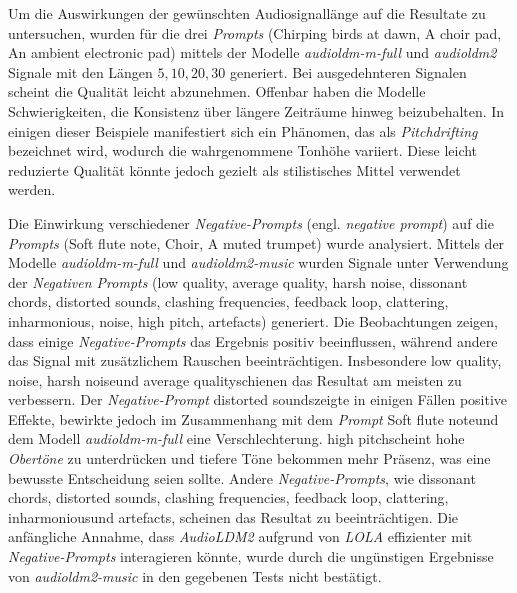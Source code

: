 \documentclass[
  a4paper,  %
  twoside,  %
  bibliography=totoc,
  headsepline,
  cleardoublepage=empty,
  parskip=half,
  draft=false
]{scrbook}
\begin{document}
{Um die Auswirkungen der gewünschten Audiosignallänge auf die Resultate zu untersuchen, wurden für die drei \emph{Prompts} (\glqq Chirping birds at dawn\grqq, \glqq A choir pad\grqq, \glqq An ambient electronic pad\grqq) mittels der Modelle \emph{audioldm-m-full} \cite{noauthor_cvsspaudioldm-m-full_nodate} und \emph{audioldm2} \cite{noauthor_cvsspaudioldm2_nodate} Signale mit den Längen $5,10,20,30$ generiert. Bei ausgedehnteren Signalen scheint die Qualität leicht abzunehmen. Offenbar haben die Modelle Schwierigkeiten, die Konsistenz über längere Zeiträume hinweg beizubehalten. In einigen dieser Beispiele manifestiert sich ein Phänomen, das als \emph{Pitchdrifting} bezeichnet wird, wodurch die wahrgenommene Tonhöhe variiert. Diese leicht reduzierte Qualität könnte jedoch gezielt als stilistisches Mittel verwendet werden.

Die Einwirkung verschiedener \emph{Negative-Prompts} (engl. \emph{negative prompt}) auf die \emph{Prompts} (\glqq Soft flute note\grqq, \glqq Choir\grqq, \glqq A muted trumpet\grqq) wurde analysiert. Mittels der Modelle \emph{audioldm-m-full} \cite{noauthor_cvsspaudioldm-m-full_nodate} und \emph{audioldm2-music} \cite{noauthor_cvsspaudioldm2-music_nodate} wurden Signale unter Verwendung der \emph{Negativen Prompts} (\glqq low quality\grqq, \glqq average quality\grqq, \glqq harsh noise\grqq, \glqq dissonant chords\grqq, \glqq distorted sounds\grqq, \glqq clashing frequencies\grqq, \glqq feedback loop\grqq, \glqq clattering\grqq, \glqq inharmonious\grqq, \glqq noise\grqq, \glqq high pitch\grqq, \glqq artefacts\grqq) generiert. Die Beobachtungen zeigen, dass einige \emph{Negative-Prompts} das Ergebnis positiv beeinflussen, während andere das Signal mit zusätzlichem Rauschen beeinträchtigen. Insbesondere \glqq low quality\grqq, \glqq noise\grqq, \glqq harsh noise\grqq und \glqq average quality\grqq schienen das Resultat am meisten zu verbessern. Der \emph{Negative-Prompt} \glqq distorted sounds\grqq zeigte in einigen Fällen positive Effekte, bewirkte jedoch im Zusammenhang mit dem \emph{Prompt} \glqq Soft flute note\grqq und dem Modell \emph{audioldm-m-full} eine Verschlechterung. \glqq high pitch\grqq scheint hohe \emph{Obertöne} zu unterdrücken und tiefere Töne bekommen mehr Präsenz, was eine bewusste Entscheidung seien sollte. Andere \emph{Negative-Prompts}, wie \glqq dissonant chords\grqq, \glqq distorted sounds\grqq, \glqq clashing frequencies\grqq, \glqq feedback loop\grqq, \glqq clattering\grqq, \glqq inharmonious\grqq und \glqq artefacts\grqq, scheinen das Resultat zu beeinträchtigen. Die anfängliche Annahme, dass \emph{AudioLDM2} aufgrund von \emph{LOLA} effizienter mit \emph{Negative-Prompts} interagieren könnte, wurde durch die ungünstigen Ergebnisse von \emph{audioldm2-music} in den gegebenen Tests nicht bestätigt.

}
\end{document}
